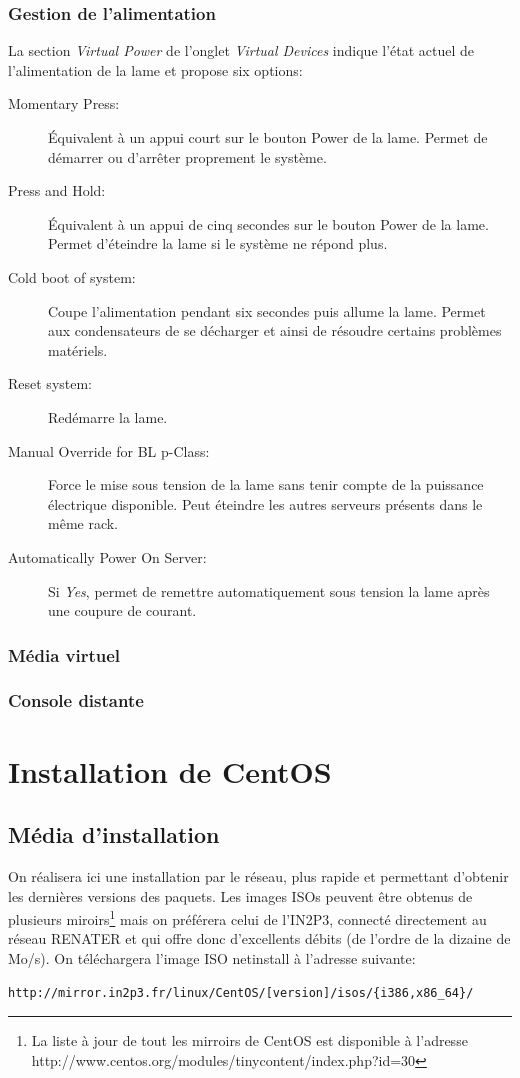 \documentclass[a4paper,oneside]{report}
\begin{document}
\subsubsection{Gestion de l'alimentation}
La section \emph{Virtual Power} de l'onglet \emph{Virtual Devices} indique l'état actuel de l'alimentation de la lame et propose six options:
\begin{description}
\item[Momentary Press:] Équivalent à un appui court sur le bouton Power de la lame.
Permet de démarrer ou d'arrêter proprement le système.
\item[Press and Hold:] Équivalent à un appui de cinq secondes sur le bouton Power de la lame.
Permet d'éteindre la lame si le système ne répond plus.
\item[Cold boot of system:] Coupe l'alimentation pendant six secondes puis allume la lame.
Permet aux condensateurs de se décharger et ainsi de résoudre certains problèmes matériels.
\item[Reset system:] Redémarre la lame.
\item[Manual Override for BL p-Class:] Force le mise sous tension de la lame sans tenir compte de la puissance électrique disponible.
Peut éteindre les autres serveurs présents dans le même rack.
\item[Automatically Power On Server:] Si \emph{Yes}, permet de remettre automatiquement sous tension la lame après une coupure de courant.
\end{description}

\subsubsection{Média virtuel}

\subsubsection{Console distante}

\section{Installation de CentOS}
\subsection{Média d'installation} \label{sec:installmediacentos}
On réalisera ici une installation par le réseau, plus rapide et permettant d'obtenir les dernières versions des paquets.
Les images ISOs peuvent être obtenus de plusieurs miroirs\footnote{La liste à jour de tout les mirroirs de CentOS est disponible à l'adresse http://www.centos.org/modules/tinycontent/index.php?id=30} mais on préférera celui de l'IN2P3, connecté directement au réseau RENATER et qui offre donc d'excellents débits (de l'ordre de la dizaine de Mo/s).\newline
On téléchargera l'image ISO netinstall à l'adresse suivante:
\begin{verbatim}
http://mirror.in2p3.fr/linux/CentOS/[version]/isos/{i386,x86_64}/
\end{verbatim}
\end{document}
